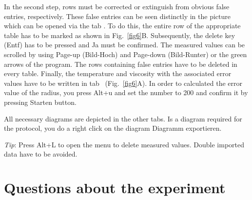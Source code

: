 \documentclass{tudphygp_eng}
\begin{document}
In the second step, rows must be corrected or extinguish from obvious false entries, respectively. These false entries can be seen distinctly in the picture \grqq which can be opened via the tab \grqq. To do this, the entire row of the appropriate table has to be marked as shown in Fig.~\ref{fig6}B. Subsequently, the delete key (\grqq{}Entf\grqq{}) has to be pressed and \grqq{}Ja\grqq{} must be confirmed. The measured values can be scrolled by using  Page-up (\grqq{}Bild-Hoch\grqq{}) and Page-down (\grqq{}Bild-Runter\grqq{}) or the green arrows of the program. The rows containing false entries have to be deleted in every table. Finally, the temperature and viscosity with the associated error values have to be written in tab \grqq\ (Fig.~\ref{fig6}A). In order to calculated the error value of the radius, you press \grqq{}Alt+u\grqq{} and set the number to 200 and confirm it by pressing \grqq{}Starten\grqq{} button.

All necessary diagrams are depicted in the other tabs. Is a diagram required for the protocol, you do a right click on the diagram \grqq{}Diagramm exportieren\grqq{}.

\emph{Tip}: Press \grqq{}Alt+L\grqq{} to open the menu to delete measured values. Double imported data have to be avoided.





\section{Questions about the experiment}
\end{document}

